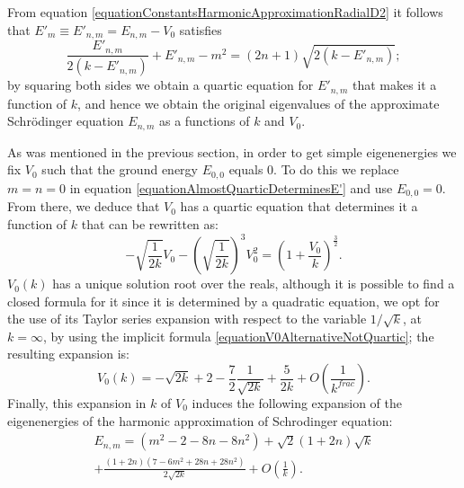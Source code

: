 From equation \eqref{equationConstantsHarmonicApproximationRadialD2} it follows that $E'_m \equiv E'_{n, m} = E_{n, m} - V_0$ satisfies
\begin{equation}\label{equationAlmostQuarticDeterminesE'}
    \frac{E'_{n, m}}{2(k - E'_{n, m})} + E'_{n, m} - m^2 = (2n+1) \sqrt{2(k - E'_{n, m})};
\end{equation}
by squaring both sides we obtain a quartic equation for $E'_{n,m}$ that makes it a function of $k$, and hence we obtain the original eigenvalues of the approximate Schr\"odinger equation $E_{n,m}$ as a functions of $k$ and $V_0$.

\lin

As was mentioned in the previous section, in order to get simple eigenenergies we fix $V_0$ such that the ground energy $E_{0, 0}$ equals $0$. To do this we replace $m = n = 0$ in equation \eqref{equationAlmostQuarticDeterminesE'} and use $E_{0, 0} = 0$. From there, we deduce that $V_0$ has a quartic equation that determines it a function of $k$ that can be rewritten as:
\begin{equation}\label{equationV0AlternativeNotQuartic}
    - \sqrt{\frac{1}{2k}}V_0 - \left( \sqrt{\frac{1}{2k}} \right)^3 V_0^2 = \left( 1 + \frac{V_0}{k} \right)^\frac{3}{2}.
\end{equation}
$V_0(k)$ has a unique solution root over the reals, although it is possible to find a closed formula for it since it is determined by a quadratic equation, we opt for the use of its Taylor series expansion with respect to the variable $1/\sqrt{k}$, at $k = \infty$, by using the implicit formula \eqref{equationV0AlternativeNotQuartic}; the resulting expansion is:
\begin{equation}\label{equationFormulaExpansionV0functionOfK}
    V_0(k) = - \sqrt{2k} + 2 - \frac{7}{2} \frac{1}{\sqrt{2k}} + \frac{5}{2k} + O\left(\frac{1}{k^{frac}}\right).
\end{equation}
Finally, this expansion in $k$ of $V_0$ induces the following expansion of the eigenenergies of the harmonic approximation of Schrodinger equation:
\begin{multline}\label{equationEigenEnergies2DSchrodingerSolutionsHarmonicApproximation}
    E_{n, m} = (m^2 - 2 -8n -8n^2) +  \sqrt{2}(1+2n)\sqrt{k}\\+ \frac{(1+2n)(7-6m^2+28n+28n^2)}{2\sqrt{2k}}+  O\left(\frac{1}{k}\right).
\end{multline}

\lin 


